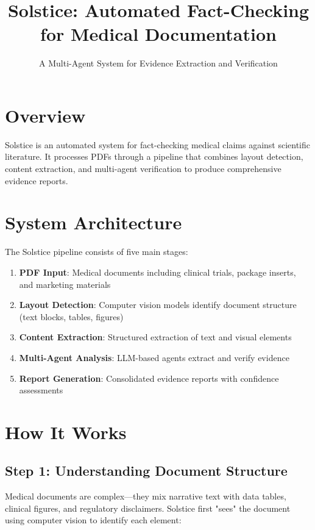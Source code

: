 \documentclass[11pt]{article}
\title{\textbf{Solstice: Automated Fact-Checking for Medical Documentation}}
\author{A Multi-Agent System for Evidence Extraction and Verification}
\date{}
\begin{document}
\maketitle

\section{Overview}

Solstice is an automated system for fact-checking medical claims against scientific literature. It processes PDFs through a pipeline that combines layout detection, content extraction, and multi-agent verification to produce comprehensive evidence reports.

\section{System Architecture}

The Solstice pipeline consists of five main stages:

\begin{enumerate}
\item \textbf{PDF Input}: Medical documents including clinical trials, package inserts, and marketing materials
\item \textbf{Layout Detection}: Computer vision models identify document structure (text blocks, tables, figures)
\item \textbf{Content Extraction}: Structured extraction of text and visual elements
\item \textbf{Multi-Agent Analysis}: LLM-based agents extract and verify evidence
\item \textbf{Report Generation}: Consolidated evidence reports with confidence assessments
\end{enumerate}

\section{How It Works}

\subsection{Step 1: Understanding Document Structure}

Medical documents are complex—they mix narrative text with data tables, clinical figures, and regulatory disclaimers. Solstice first "sees" the document using computer vision to identify each element:
\end{document}
